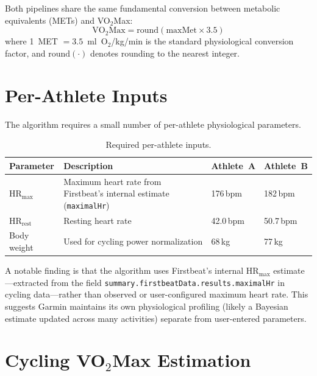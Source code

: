 \documentclass[11pt,a4paper]{article}
\begin{document}
Both pipelines share the same fundamental conversion between metabolic equivalents (METs) and VO$_2$Max:
\begin{equation}
\text{VO}_2\text{Max} = \text{round}(\text{maxMet} \times 3.5)
\label{eq:met-conversion}
\end{equation}
where 1~MET $= 3.5$~ml~O$_2$/kg/min is the standard physiological conversion factor, and $\text{round}(\cdot)$ denotes rounding to the nearest integer.


\section{Per-Athlete Inputs}
\label{sec:inputs}

The algorithm requires a small number of per-athlete physiological parameters.

\begin{table}[H]
\centering
\caption{Required per-athlete inputs.}
\label{tab:inputs}
\begin{tabular}{@{}lp{7cm}ll@{}}
\toprule
\textbf{Parameter} & \textbf{Description} & \textbf{Athlete~A} & \textbf{Athlete~B} \\
\midrule
HR$_{\text{max}}$ & Maximum heart rate from Firstbeat's internal estimate (\texttt{maximalHr}) & 176\,bpm & 182\,bpm \\
HR$_{\text{rest}}$ & Resting heart rate & 42.0\,bpm & 50.7\,bpm \\
Body weight & Used for cycling power normalization & 68\,kg & 77\,kg \\
\bottomrule
\end{tabular}
\end{table}

A notable finding is that the algorithm uses Firstbeat's internal HR$_{\text{max}}$ estimate---extracted from the field
\texttt{summary.firstbeatData\allowbreak{}.results\allowbreak{}.maximalHr} in cycling data---rather than observed or user-configured maximum heart rate.
This suggests Garmin maintains its own physiological profiling (likely a Bayesian estimate updated across many activities) separate from user-entered parameters.


\section{Cycling VO$_2$Max Estimation}
\label{sec:cycling}
\end{document}
